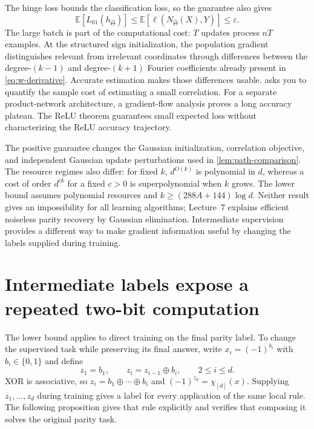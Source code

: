 \documentclass[11pt,twoside]{article}
\newcommand{\E}{\mathbb E}
\theoremstyle{definition}
\theoremstyle{remark}
\begin{document}
The hinge loss bounds the classification loss, so the guarantee also gives
\[
 \E[L_{01}(h_{\widehat\Theta})]
 \le\E[\ell(N_{\widehat\Theta}(X),Y)]\le\varepsilon.
\]
The large batch is part of the computational cost: $T$ updates process $nT$
examples. At the structured sign initialization, the population gradient
distinguishes relevant from irrelevant coordinates through differences
between the degree-$(k-1)$ and
degree-$(k+1)$ Fourier coefficients already present in
\cref{eq:w-derivative}. Accurate estimation makes those differences
usable.  asks you to quantify the sample cost
of estimating a small correlation. For a separate product-network architecture,
a gradient-flow analysis proves a long accuracy plateau. The ReLU theorem
guarantees small expected loss without characterizing the ReLU accuracy
trajectory.

The positive guarantee changes the Gaussian initialization, correlation
objective, and independent Gaussian update perturbations used in
\cref{lem:path-comparison}. The resource regimes also differ: for fixed $k$,
$d^{O(k)}$ is polynomial in $d$, whereas a cost of order $d^{ck}$ for a fixed
$c>0$ is superpolynomial when $k$ grows. The lower bound assumes polynomial
resources and $k\ge(288A+144)\log d$. Neither result gives an impossibility
for all learning algorithms; Lecture~7 explains efficient noiseless parity
recovery by Gaussian elimination. Intermediate supervision provides a
different way to make gradient information useful by changing the labels
supplied during training.

\section{Intermediate labels expose a repeated two-bit computation}
\label{sec:intermediate}

The lower bound applies to direct training on the final parity label. To change
the supervised task while preserving its final answer, write
$x_i=(-1)^{b_i}$ with $b_i\in\{0,1\}$ and define
\begin{equation}
z_1=b_1,
\qquad
z_i=z_{i-1}\oplus b_i,
\qquad 2\le i\le d.
\label{eq:running-parity}
\end{equation}
XOR is associative, so $z_i=b_1\oplus\cdots\oplus b_i$ and
$(-1)^{z_d}=\chi_{[d]}(x)$. Supplying
$z_1,\ldots,z_d$ during training gives a label for every application of the
same local rule. The following proposition gives that rule explicitly and
verifies that composing it solves the original parity task.
\end{document}
